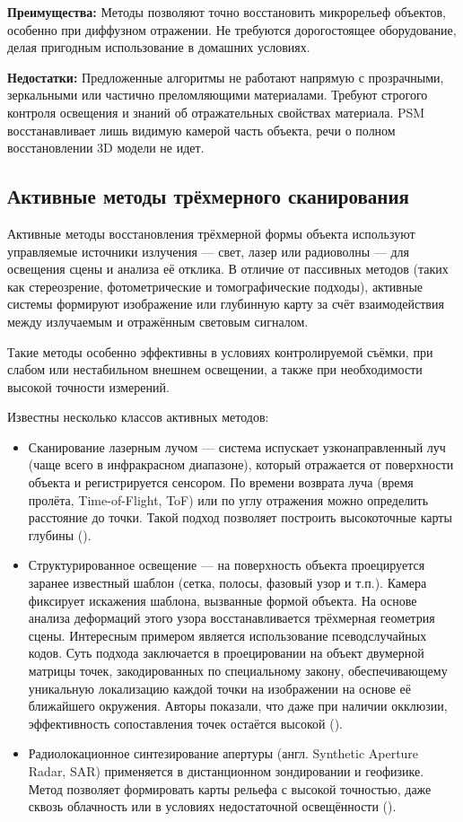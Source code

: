 \textbf{Преимущества:} Методы позволяют точно восстановить микрорельеф объектов,
особенно при диффузном отражении. Не требуются дорогостоящее оборудование,
делая пригодным использование в домашних условиях.

\textbf{Недостатки:} Предложенные алгоритмы не работают напрямую с прозрачными,
зеркальными или частично преломляющими материалами. Требуют строгого контроля
освещения и знаний об отражательных свойствах материала. PSM восстанавливает
лишь видимую камерой часть объекта, речи о полном восстановлении 3D модели не идет.

\subsection{Активные методы трёхмерного сканирования}

Активные методы восстановления трёхмерной формы объекта используют управляемые
источники излучения — свет, лазер или радиоволны — для освещения сцены и анализа
её отклика. В отличие от пассивных методов (таких как стереозрение,
фотометрические и томографические подходы), активные системы формируют
изображение или глубинную карту за счёт взаимодействия между излучаемым и
отражённым световым сигналом.

Такие методы особенно эффективны в условиях контролируемой съёмки, при слабом
или нестабильном внешнем освещении, а также при необходимости высокой точности
измерений.

Известны несколько классов активных методов:

\begin{itemize}
	\item Сканирование лазерным лучом — система испускает узконаправленный луч
	(чаще всего в инфракрасном диапазоне), который отражается от поверхности
	объекта и регистрируется сенсором. По времени возврата луча (время
	пролёта, Time-of-Flight, ToF) или по углу отражения можно определить
	расстояние до точки. Такой подход позволяет построить высокоточные карты
	глубины (\cite{10.1109/CVPR.2010.5540082}).
	\item Структурированное освещение — на поверхность объекта проецируется
	заранее известный шаблон (сетка, полосы, фазовый узор и т.п.). Камера
	фиксирует искажения шаблона, вызванные формой объекта. На основе анализа
	деформаций этого узора восстанавливается трёхмерная геометрия сцены. Интересным
	примером является использование псеводслучайных кодов. Суть подхода
	заключается в проецировании на объект двумерной матрицы точек, закодированных
	по специальному закону, обеспечивающему уникальную локализацию каждой точки на
	изображении на основе её ближайшего окружения. Авторы показали, что даже при наличии
	окклюзии, эффективность сопоставления точек остаётся высокой (\cite{10.1109/34.667888}).
	\item Радиолокационное синтезирование апертуры (англ. Synthetic Aperture
	Radar, SAR) применяется в дистанционном зондировании и геофизике. Метод
	позволяет формировать карты рельефа с высокой точностью, даже сквозь
	облачность или в условиях недостаточной освещённости (\cite{Antipov1988}).
\end{itemize}

